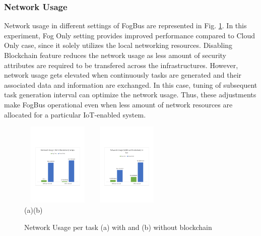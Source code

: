 \documentclass[final,5p,times,twocolumn]{elsarticle}
\begin{document}
\subsubsection{Network Usage}
%
Network usage in different settings of FogBus are represented in Fig. \ref{fig:netuse}. In this experiment, Fog Only setting provides improved performance compared to Cloud Only case, since it solely utilizes the local networking resources. Disabling Blockchain feature reduces the network usage as less amount of security attributes are required to be transfered across the infrastructures. However, network usage gets elevated when continuously tasks are generated and their associated data and information are exchanged. In this case, tuning of subsequent task generation interval can optimize the network usage. Thus, these adjustments make FogBus operational even when less amount of network resources are allocated for a particular IoT-enabled system.     
%
\begin{figure}[h]
	\begin{center}
	\centering
		\includegraphics[width=35mm, height=40mm]{NetUsage1}
		\hspace{20pt}
		\includegraphics[width=35mm, height=40mm]{NetUsage2}\\
        \footnotesize{(a)\hspace{120pt}(b)}\\		 
   	\caption{Network Usage per task (a) with and (b) without blockchain} \label{fig:netuse}
	\end{center}
\end{figure}
%
\end{document}
